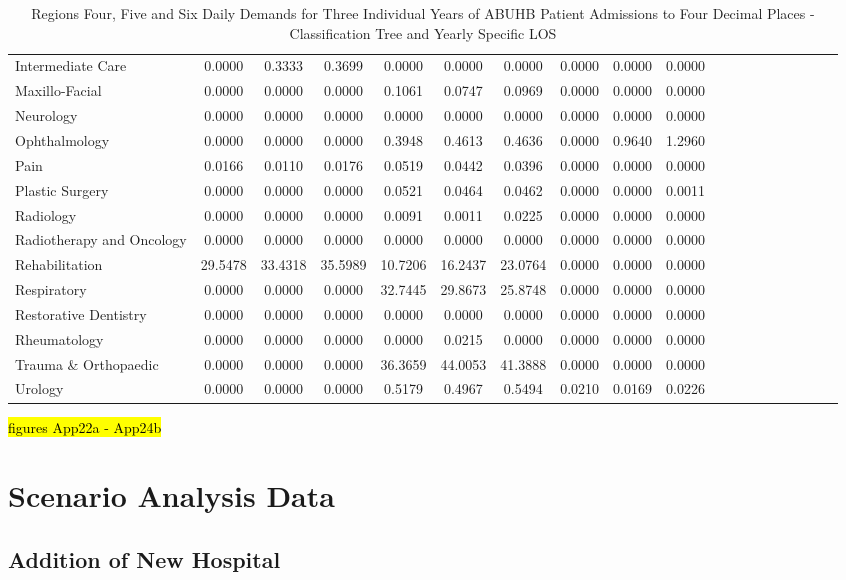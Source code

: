 \documentclass[thesis.tex]{subfiles}
\begin{document}
\begin{landscape}
\begin{table}[h!]
{\begin{tabular}{lcccccccccccccccccc}
Intermediate Care&	0.0000&	0.3333&	0.3699&	0.0000&	0.0000&	0.0000&	0.0000&	0.0000&	0.0000\\
Maxillo-Facial&	0.0000&	0.0000&	0.0000&	0.1061&	0.0747&	0.0969&	0.0000&	0.0000&	0.0000\\
Neurology&	0.0000&	0.0000&	0.0000&	0.0000&	0.0000&	0.0000&	0.0000&	0.0000&	0.0000\\
Ophthalmology&	0.0000&	0.0000&	0.0000&	0.3948&	0.4613&	0.4636&	0.0000&	0.9640&	1.2960\\
Pain&	0.0166&	0.0110&	0.0176&	0.0519&	0.0442&	0.0396&	0.0000&	0.0000&	0.0000\\
Plastic Surgery&	0.0000&	0.0000&	0.0000&	0.0521&	0.0464&	0.0462&	0.0000&	0.0000&	0.0011\\
Radiology&	0.0000&	0.0000&	0.0000&	0.0091&	0.0011&	0.0225&	0.0000&	0.0000&	0.0000\\
Radiotherapy and Oncology&	0.0000&	0.0000&	0.0000&	0.0000&	0.0000&	0.0000&	0.0000&	0.0000&	0.0000\\
Rehabilitation&	29.5478&	33.4318&	35.5989&	10.7206&	16.2437&	23.0764&	0.0000&	0.0000&	0.0000\\
Respiratory&	0.0000&	0.0000&	0.0000&	32.7445&	29.8673&	25.8748&	0.0000&	0.0000&	0.0000\\
Restorative Dentistry&	0.0000&	0.0000&	0.0000&	0.0000&	0.0000&	0.0000&	0.0000&	0.0000&	0.0000\\
Rheumatology&	0.0000&	0.0000&	0.0000&	0.0000&	0.0215&	0.0000&	0.0000&	0.0000&	0.0000\\
Trauma \& Orthopaedic&	0.0000&	0.0000&	0.0000&	36.3659&	44.0053&	41.3888&	0.0000&	0.0000&	0.0000\\
Urology&	0.0000&	0.0000&	0.0000&	0.5179&	0.4967&	0.5494&	0.0210&	0.0169&	0.0226\\

\bottomrule
\end{tabular}  } 
\caption{Regions Four, Five and Six Daily Demands for Three Individual Years of ABUHB Patient Admissions to Four Decimal Places - Classification Tree and Yearly Specific LOS}
    \label{apptab:LinkedDemands10b}
\end{table}  
\end{landscape}
\hl{figures App22a - App24b}


\section{Scenario Analysis Data}

\subsection{Addition of New Hospital}
\end{document}
